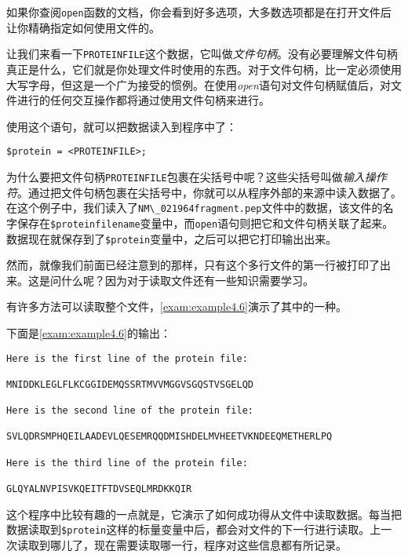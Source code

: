 如果你查阅\verb|open|函数的文档，你会看到好多选项，大多数选项都是在打开文件后让你精确指定如何使用文件的。

让我们来看一下\verb|PROTEINFILE|这个数据，它叫做\textit{文件句柄}。没有必要理解文件句柄真正是什么，它们就是你处理文件时使用的东西。对于文件句柄，比一定必须使用大写字母，但这是一个广为接受的惯例。在使用\textit{open}语句对文件句柄赋值后，对文件进行的任何交互操作都将通过使用文件句柄来进行。

使用这个语句，就可以把数据读入到程序中了：

\begin{lstlisting}
$protein = <PROTEINFILE>;
\end{lstlisting}

为什么要把文件句柄\verb|PROTEINFILE|包裹在尖括号中呢？这些尖括号叫做\textit{输入操作符}。通过把文件句柄包裹在尖括号中，你就可以从程序外部的来源中读入数据了。在这个例子中，我们读入了\verb|NM\_021964fragment.pep|文件中的数据，该文件的名字保存在\verb|$proteinfilename|变量中，而\verb|open|语句则把它和文件句柄关联了起来。数据现在就保存到了\verb|$protein|变量中，之后可以把它打印输出出来。

然而，就像我们前面已经注意到的那样，只有这个多行文件的第一行被打印了出来。这是问什么呢？因为对于读取文件还有一些知识需要学习。

有许多方法可以读取整个文件，\autoref{exam:example4.6}演示了其中的一种。



下面是\autoref{exam:example4.6}的输出：

\begin{lstlisting}
Here is the first line of the protein file:

MNIDDKLEGLFLKCGGIDEMQSSRTMVVMGGVSGQSTVSGELQD

Here is the second line of the protein file:

SVLQDRSMPHQEILAADEVLQESEMRQQDMISHDELMVHEETVKNDEEQMETHERLPQ

Here is the third line of the protein file:

GLQYALNVPISVKQEITFTDVSEQLMRDKKQIR
\end{lstlisting}

这个程序中比较有趣的一点就是，它演示了如何成功得从文件中读取数据。每当把数据读取到\verb|$protein|这样的标量变量中后，都会对文件的下一行进行读取。上一次读取到哪儿了，现在需要读取哪一行，程序对这些信息都有所记录。

